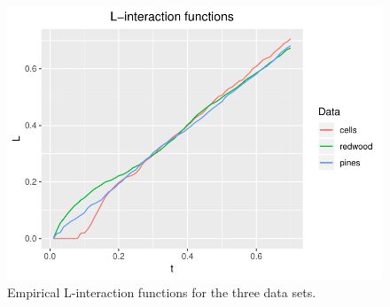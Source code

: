 \begin{figure}
    \centering
    \includegraphics[scale=0.95]{figures/prob1_L_empirical.pdf}
    \caption{Empirical L-interaction functions for the three data sets.}
    \label{fig:L_emp}
\end{figure}